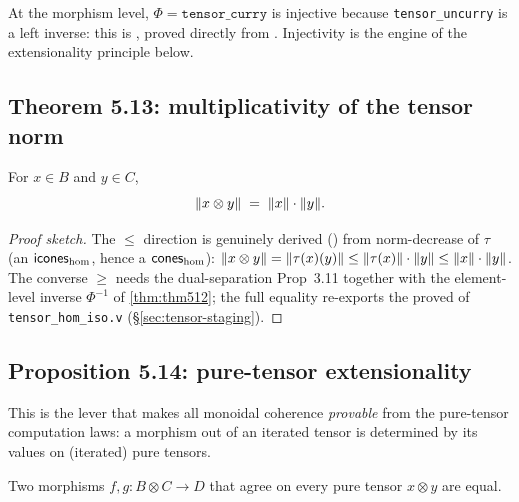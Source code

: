 At the morphism level, $\Phi = \texttt{tensor\_curry}$ is injective
because \texttt{tensor\_uncurry} is a left inverse: this is
\rocqok, proved directly
from . Injectivity
is the engine of the extensionality principle below.

\subsection{Theorem 5.13: multiplicativity of the tensor norm}%
\label{sec:thm513}

\begin{theorem}\label{thm:thm513}
\rocqok
{}
For $x \in B$ and $y \in C$,
\[
  \lVert x \otimes y \rVert \;=\; \lVert x \rVert \cdot \lVert y \rVert.
\]
\end{theorem}

\begin{proof}[Proof sketch]
The $\le$ direction is genuinely derived
() from norm-decrease of
$\tau$ (an $\mathsf{icones}_{\mathrm{hom}}$, hence a $\mathsf{cones}_{\mathrm{hom}}$):
$\lVert x \otimes y \rVert = \lVert \tau(x)(y) \rVert \le \lVert \tau(x) \rVert \cdot
\lVert y \rVert \le \lVert x \rVert \cdot \lVert y \rVert$. The converse $\ge$ needs the
dual-separation Prop~3.11 together with the element-level inverse
$\Phi^{-1}$ of \autoref{thm:thm512}; the full equality
 re-exports the proved
 of \texttt{tensor\_hom\_iso.v}
(\S\ref{sec:tensor-staging}).
\end{proof}

\subsection{Proposition 5.14: pure-tensor extensionality}%
\label{sec:tensor-ext}

This is the lever that makes all monoidal coherence \emph{provable}
from the pure-tensor computation laws: a morphism out of an iterated
tensor is determined by its values on (iterated) pure tensors.

\begin{lemma}\label{lem:tensor-ext}
\rocqok
{}
Two morphisms $f, g : B \otimes C \to D$ that agree on every pure
tensor $x \otimes y$ are equal.
\end{lemma}

